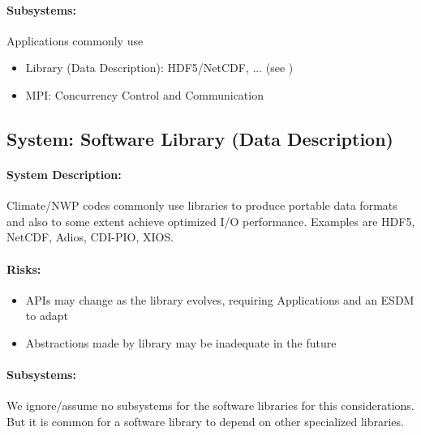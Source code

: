 \paragraph{Subsystems:}
Applications commonly use

\begin{itemize}
	\item Library (Data Description): HDF5/NetCDF, ...  (see )
	\item MPI: Concurrency Control and Communication %
\end{itemize}

\subsection{System: Software Library (Data Description)}
\label{System: Library}


\paragraph{System Description:}
Climate/NWP codes commonly use libraries to produce portable data formats and also to some extent achieve optimized I/O performance.
Examples are HDF5, NetCDF, Adios, CDI-PIO, XIOS.


\paragraph{Risks:}
\begin{itemize}
	\item APIs may change as the library evolves, requiring Applications and an ESDM to adapt
	\item Abstractions made by library may be inadequate in the future
\end{itemize}


\paragraph{Subsystems:}
We ignore/assume no subsystems for the software libraries for this considerations.
But it is common for a software library to depend on other specialized libraries.




